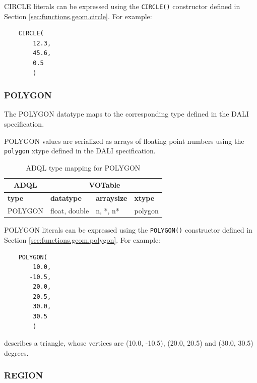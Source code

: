 \documentclass[11pt,a4paper]{ivoa}
\newcommand{\DALIspec}{DALI specification\xspace}
\newcommand{\SectionRef}[1]{Section \ref{#1}\xspace}
\begin{document}
CIRCLE literals can be expressed using the \verb:CIRCLE():
constructor defined in \SectionRef{sec:functions.geom.circle}.
For example:
\begin{verbatim}
    CIRCLE(
        12.3,
        45.6,
        0.5
        )
\end{verbatim}

\subsubsection{POLYGON}
\label{sec:types.geom.polygon}

The POLYGON datatype maps to the corresponding type defined in the
\DALIspec.

POLYGON values are serialized as arrays of floating point numbers
using the \verb:polygon: xtype defined in the \DALIspec.

\begin{table}[thm]\footnotesize
    \begin{tabular}
        {|p{}|p{}|p{}|p{}|}
        \hline

        \hline
        \multicolumn{1}{|c|}{\textbf{ADQL}} &
        \multicolumn{3}{|c|}{\textbf{VOTable}}
        \tabularnewline
        
        \hline
        \textbf{type} &
        \textbf{datatype} &
        \textbf{arraysize} &
        \textbf{xtype}
        \tabularnewline

        \hline
        POLYGON &
        float, double &
        n, *, n* &
        polygon
        \tabularnewline

        \hline
    \end{tabular}
    \caption{ADQL type mapping for POLYGON}
    \label{table:types.geom.polygon}
\end{table}

POLYGON literals can be expressed using the \verb:POLYGON():
constructor defined in \SectionRef{sec:functions.geom.polygon}.
For example:
\begin{verbatim}
    POLYGON(
        10.0,
       -10.5,
        20.0,
        20.5,
        30.0,
        30.5
        )
\end{verbatim}
\noindent
describes a triangle, whose vertices are (10.0, -10.5), (20.0, 20.5)
and (30.0, 30.5) degrees.

\subsubsection{REGION}
\label{sec:types.geom.region}
\end{document}
